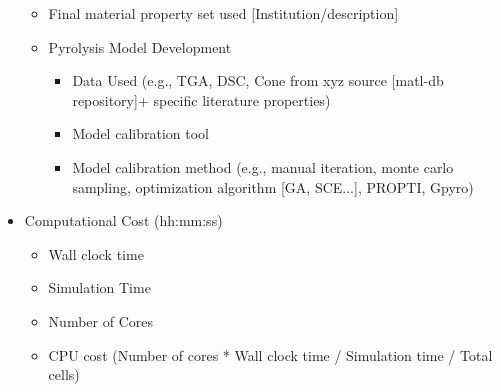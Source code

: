 \documentclass[12pt]{article}
\begin{document}
\begin{itemize}[noitemsep]
 		\begin{itemize}[noitemsep]
	 	\item Final material property set used [Institution/description]
	 		\item Pyrolysis Model Development
			\begin{itemize}[noitemsep]
	 		\item Data Used (e.g., TGA, DSC, Cone from xyz source [matl-db repository]+ specific literature properties)
	 		\item Model calibration tool
	 		\item Model calibration method (e.g., manual iteration, monte carlo sampling, optimization algorithm [GA, SCE...], PROPTI, Gpyro)
			\end{itemize} 
 	 	\end{itemize} 
 \item Computational Cost (hh:mm:ss)
 	\begin{itemize}[noitemsep]
 	\item Wall clock time
 	\item Simulation Time
 	\item Number of Cores
 	\item CPU cost (Number of cores * Wall clock time / Simulation time / Total cells)
 	\end{itemize}
\end{itemize}

\newpage
\end{document}
